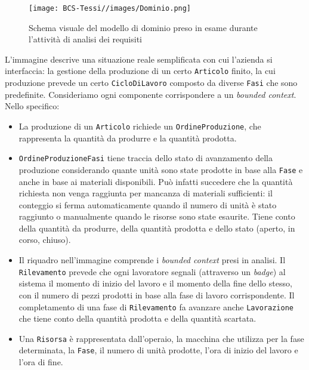         \begin{figure}[H]
            \centering
            \texttt{[image: BCS-Tessi//images/Dominio.png]}
            \caption[Modello di dominio preso in esame]{Schema visuale del modello di dominio preso in esame durante l'attività di analisi dei requisiti}
            \label{fig:Dominio}
        \end{figure}

        \vspace{0.2 em}
        \noindent L'immagine descrive una situazione reale semplificata con cui l'azienda si interfaccia: la gestione della produzione di un certo \texttt{Articolo} finito, la cui produzione prevede un certo \texttt{CicloDiLavoro} composto da diverse \texttt{Fasi} che sono predefinite. Consideriamo ogni componente corrispondere a un \textit{bounded context}.
        Nello specifico: 
        \begin{itemize}
            \item La produzione di un \texttt{Articolo} richiede un \texttt{OrdineProduzione}, che rappresenta la quantità da produrre e la quantità prodotta.
            \item \texttt{OrdineProduzioneFasi} tiene traccia dello stato di avanzamento della produzione considerando quante unità sono state prodotte in base alla \texttt{Fase} e anche in base ai materiali disponibili. Può infatti succedere che la quantità richiesta non venga raggiunta per mancanza di materiali sufficienti: il conteggio si ferma automaticamente quando il numero di unità è stato raggiunto o manualmente quando le risorse sono state esaurite. Tiene conto della quantità da produrre, della quantità prodotta e dello stato (aperto, in corso, chiuso).
            \item Il riquadro nell'immagine comprende i \textit{bounded context} presi in analisi. Il \texttt{Rilevamento} prevede che ogni lavoratore segnali (attraverso un \textit{badge}) al sistema il momento di inizio del lavoro e il momento della fine dello stesso, con il numero di pezzi prodotti in base alla fase di lavoro corrispondente. Il completamento di una fase di \texttt{Rilevamento} fa avanzare anche \texttt{Lavorazione} che tiene conto della quantità prodotta e della quantità scartata.
            \item Una \texttt{Risorsa} è rappresentata dall'operaio, la macchina che utilizza per la fase determinata, la \texttt{Fase}, il numero di unità prodotte, l'ora di inizio del lavoro e l'ora di fine.
        \end{itemize}

